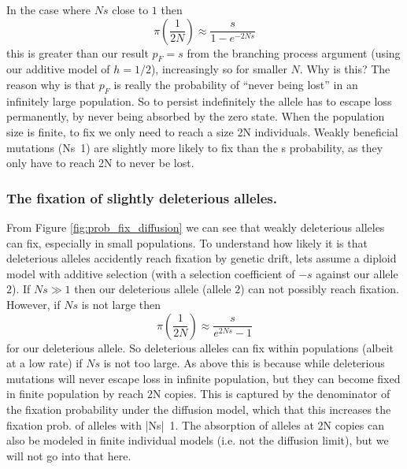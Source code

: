 In the case where $Ns$ close to $1$ then
\begin{equation}
\pi \left( \frac{1}{2N} \right) \approx \frac{s}{1-e^{-2Ns}} \label{eqn:escape_from_intro}
\end{equation}
this is greater than our result $p_F=s$ from the branching process
argument (using our additive model of $h=1/2$), increasingly so for smaller $N$. 
Why is this?  The reason why is that $p_F$ is really the probability
of “never being lost” in an infinitely large population. So to persist
indefinitely the allele has to escape loss permanently, by never being
absorbed by the zero state. When the population size is finite, to fix
we only need to reach a size 2N individuals. Weakly beneficial
mutations (Ns~1) are slightly more likely to fix than the s
probability, as they only have to reach 2N to never be lost.



\subsubsection{The fixation of slightly deleterious alleles.}
From Figure \ref{fig:prob_fix_diffusion} we can see that weakly
deleterious alleles can fix, especially in small populations.  To understand how
likely it is that deleterious alleles accidently reach fixation by
genetic drift, lets assume a diploid model with additive selection (with
a selection coefficient of $-s$ against our allele $2$).  
If $N s \gg 1$ then our deleterious allele (allele $2$) can not possibly reach
fixation. However, if $Ns$ is not large then
\begin{equation}
\pi \left( \frac{1}{2N} \right) \approx \frac{s}{e^{2Ns}-1} \label{eqn:fix_deleterious}
\end{equation}
for our deleterious allele. So deleterious alleles can fix within
populations (albeit at a low rate) if $Ns$ is not too large. As above
this is because while deleterious mutations will never escape loss in
infinite population, but they can become fixed in finite population by
reach 2N copies. This is captured by the denominator of the fixation
probability under the diffusion model, which that this increases the
fixation prob. of alleles with |Ns|~1. The absorption of alleles at 2N
copies can also be modeled in finite individual models (i.e. not the
diffusion limit), but we will not go into that here. 


